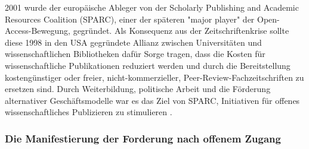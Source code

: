 2001 wurde der europäische Ableger von der Scholarly Publishing and Academic Resources Coalition (SPARC), einer der späteren "major player" der Open-Access-Bewegung, \cite{Russell_2008} \cite{Herb_2012} gegründet. Als Konsequenz aus der Zeitschriftenkrise sollte diese 1998 in den USA gegründete Allianz zwischen Universitäten und wissenschaftlichen Bibliotheken dafür Sorge tragen, dass die Kosten für wissenschaftliche Publikationen reduziert werden und durch die Bereitstellung kostengünstiger oder freier, nicht-kommerzieller, Peer-Review-Fachzeitschriften zu ersetzen sind. Durch Weiterbildung, politische Arbeit und die Förderung alternativer Geschäftsmodelle war es das Ziel von SPARC, Initiativen für offenes wissenschaftliches Publizieren zu stimulieren \cite{SPARC_2015}.

\subsubsection{Die Manifestierung der Forderung nach offenem Zugang}

